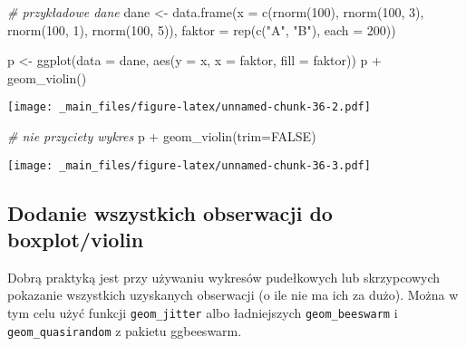 \documentclass[
]{book}
\newenvironment{Shaded}{\begin{snugshade}}{\end{snugshade}}
\newcommand{\AttributeTok}[1]{\textcolor[rgb]{0.77,0.63,0.00}{#1}}
\newcommand{\CommentTok}[1]{\textcolor[rgb]{0.56,0.35,0.01}{\textit{#1}}}
\newcommand{\ConstantTok}[1]{\textcolor[rgb]{0.00,0.00,0.00}{#1}}
\newcommand{\DecValTok}[1]{\textcolor[rgb]{0.00,0.00,0.81}{#1}}
\newcommand{\FunctionTok}[1]{\textcolor[rgb]{0.00,0.00,0.00}{#1}}
\newcommand{\NormalTok}[1]{#1}
\newcommand{\OtherTok}[1]{\textcolor[rgb]{0.56,0.35,0.01}{#1}}
\newcommand{\SpecialCharTok}[1]{\textcolor[rgb]{0.00,0.00,0.00}{#1}}
\newcommand{\StringTok}[1]{\textcolor[rgb]{0.31,0.60,0.02}{#1}}
\begin{document}
\begin{Shaded}
\begin{Highlighting}[]
\CommentTok{\# przykładowe dane}
\NormalTok{dane }\OtherTok{\textless{}{-}} \FunctionTok{data.frame}\NormalTok{(}\AttributeTok{x =} \FunctionTok{c}\NormalTok{(}\FunctionTok{rnorm}\NormalTok{(}\DecValTok{100}\NormalTok{), }\FunctionTok{rnorm}\NormalTok{(}\DecValTok{100}\NormalTok{, }\DecValTok{3}\NormalTok{), }\FunctionTok{rnorm}\NormalTok{(}\DecValTok{100}\NormalTok{, }\DecValTok{1}\NormalTok{), }\FunctionTok{rnorm}\NormalTok{(}\DecValTok{100}\NormalTok{, }\DecValTok{5}\NormalTok{)), }
                   \AttributeTok{faktor =} \FunctionTok{rep}\NormalTok{(}\FunctionTok{c}\NormalTok{(}\StringTok{"A"}\NormalTok{, }\StringTok{"B"}\NormalTok{), }\AttributeTok{each =} \DecValTok{200}\NormalTok{))}

\NormalTok{p }\OtherTok{\textless{}{-}} \FunctionTok{ggplot}\NormalTok{(}\AttributeTok{data =}\NormalTok{ dane, }\FunctionTok{aes}\NormalTok{(}\AttributeTok{y =}\NormalTok{ x, }\AttributeTok{x =}\NormalTok{ faktor, }\AttributeTok{fill =}\NormalTok{ faktor))}
\NormalTok{p }\SpecialCharTok{+} \FunctionTok{geom\_violin}\NormalTok{()}
\end{Highlighting}
\end{Shaded}

\texttt{[image: \_main\_files/figure-latex/unnamed-chunk-36-2.pdf]}

\begin{Shaded}
\begin{Highlighting}[]
\CommentTok{\# nie przyciety wykres}
\NormalTok{p }\SpecialCharTok{+} \FunctionTok{geom\_violin}\NormalTok{(}\AttributeTok{trim=}\ConstantTok{FALSE}\NormalTok{)}
\end{Highlighting}
\end{Shaded}

\texttt{[image: \_main\_files/figure-latex/unnamed-chunk-36-3.pdf]}

\hypertarget{dodanie-wszystkich-obserwacji-do-boxplotviolin}{%
\subsection{Dodanie wszystkich obserwacji do boxplot/violin}\label{dodanie-wszystkich-obserwacji-do-boxplotviolin}}

Dobrą praktyką jest przy używaniu wykresów pudełkowych lub skrzypcowych pokazanie wszystkich uzyskanych obserwacji (o ile nie ma ich za dużo). Można w tym celu użyć funkcji \texttt{geom\_jitter} albo ładniejszych \texttt{geom\_beeswarm} i \texttt{geom\_quasirandom} z pakietu ggbeeswarm.
\end{document}
